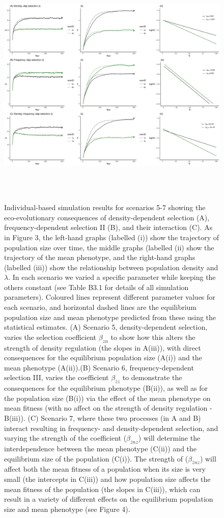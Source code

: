\documentclass{article}
\begin{document}
\newpage
\begin{figure} [H]
	\centering
	\includegraphics[width=12cm, height=12cm]{Figures/Fig4.pdf}
	\caption{Individual-based simulation results for scenarios 5-7 showing the eco-evolutionary consequences of density-dependent selection (A), frequency-dependent selection II (B), and their interaction (C). As in Figure 3, the left-hand graphs (labelled (i)) show the trajectory of population size over time, the middle graphs (labelled (ii) show the trajectory of the mean phenotype, and the right-hand graphs (labelled (iii)) show the relationship between population density and $\lambda$. In each scenario we varied a specific parameter while keeping the others constant (see Table B3.1 for details of all simulation parameters). Coloured lines represent different parameter values for each scenario, and horizontal dashed lines are the equilibrium population size and mean phenotype predicted from these using the statistical estimates. (A) Scenario 5, density-dependent selection, varies the selection coefficient $\beta_{zn}$ to show how this alters the strength of density regulation (the slopes in A(iii)), with direct consequences for the equilibrium population size (A(i)) and the mean phenotype (A(ii)).(B) Scenario 6, frequency-dependent selection III, varies the coefficient $\beta_{\bar{z}z}$ to demonstrate the consequences for the equilibrium phenotype (B(ii)), as well as for the population size (B(i)) via the effect of the mean phenotype on mean fitness (with no affect on the strength of density regulation - B(iii)). (C) Scenario 7, where these two processes (in A and B) interact resulting in frequency- and density-dependent selection, and varying the strength of the coefficient ($\beta_{\bar{z}nz}$) will determine the interdependence between the mean phenotype (C(ii)) and the equilibrium size of the population (C(i)). The strength of ($\beta_{\bar{z}nz}$) will affect both the mean fitness of a population when its size is very small (the intercepts in C(iii)) and how population size affects the mean fitness of the population (the slopes in C(iii)), which can result in a variety of different effects on the equilibrium population size and mean phenotype (see Figure 4).} 

\end{figure}
\end{document}
